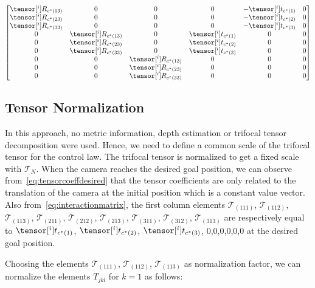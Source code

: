 \begin{equation}
\begin{gathered}
\begin{bmatrix}
      \tensor[^{i}]{R}{_{c^*(13)}} & 0 & 0 & 0 & - \tensor[^{i}]{t}{_{c^*(1)}} &0\\
      \tensor[^{i}]{R}{_{c^*(23)}} & 0 & 0 & 0 & - \tensor[^{i}]{t}{_{c^*(2)}} &0\\
      \tensor[^{i}]{R}{_{c^*(33)}} & 0 & 0 & 0 & - \tensor[^{i}]{t}{_{c^*(3)}} &0\\

      0 & \tensor[^{i}]{R}{_{c^*(13)}} & 0 & \tensor[^{i}]{t}{_{c^*(1)}} & 0 & 0\\
      0 & \tensor[^{i}]{R}{_{c^*(23)}} & 0 & \tensor[^{i}]{t}{_{c^*(2)}} & 0 & 0\\
      0 & \tensor[^{i}]{R}{_{c^*(33)}} & 0 & \tensor[^{i}]{t}{_{c^*(3)}} & 0 & 0\\

      0 & 0 & \tensor[^{i}]{R}{_{c^*(13)}} & 0 & 0 & 0 \\
      0 & 0 & \tensor[^{i}]{R}{_{c^*(23)}} & 0 & 0 & 0 \\
      0 & 0 & \tensor[^{i}]{R}{_{c^*(33)}} & 0 & 0 & 0
  \end{bmatrix}
\end{gathered}\label{eq:interactionmatrixdesired}
\end{equation}
\subsection{Tensor Normalization}
\label{sub:tensor_normalization}
In this approach, no metric information, depth estimation or trifocal tensor decomposition were used. Hence, we need to define a common scale of the trifocal tensor for the control law. The trifocal tensor is normalized to get a fixed scale with $\mathcal{T}_{N}$. When the camera reaches the desired goal position, we can observe from~\eqref{eq:tensorcoeffdesired} that the tensor coefficients are only related to the translation of the camera at the initial position which is a constant value vector. Also from~\eqref{eq:interactionmatrix}, the first column elements $\mathcal{T}_{(111)}$, $\mathcal{T}_{(112)}$, $\mathcal{T}_{(113)}$, $\mathcal{T}_{(211)}$, $\mathcal{T}_{(212)}$, $\mathcal{T}_{(213)}$, $\mathcal{T}_{(311)}$, $\mathcal{T}_{(312)}$, $\mathcal{T}_{(313)}$ are respectively equal to $\tensor[^{i}]{t}{_{c^*(1)}}$, $\tensor[^{i}]{t}{_{c^*(2)}}$, $\tensor[^{i}]{t}{_{c^*(3)}}$, $0$,$0$,$0$,$0$,$0$,$0$ at the desired goal position.

Choosing the elements $\mathcal{T}_{(111)}$, $\mathcal{T}_{(112)}$, $\mathcal{T}_{(113)}$ as normalization factor, we can normalize the elements $T_{jkl}$ for $k = 1$ as follows:

